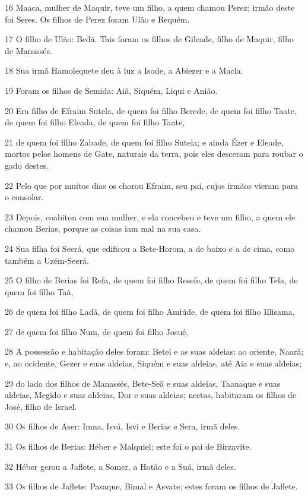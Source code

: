 \par 16 Maaca, mulher de Maquir, teve um filho, a quem chamou Perez; irmão deste foi Seres. Os filhos de Perez foram Ulão e Requém.
\par 17 O filho de Ulão: Bedã. Tais foram os filhos de Gileade, filho de Maquir, filho de Manassés.
\par 18 Sua irmã Hamolequete deu à luz a Isode, a Abiezer e a Macla.
\par 19 Foram os filhos de Semida: Aiã, Siquém, Liqui e Anião.
\par 20 Era filho de Efraim Sutela, de quem foi filho Berede, de quem foi filho Taate, de quem foi filho Eleada, de quem foi filho Taate,
\par 21 de quem foi filho Zabade, de quem foi filho Sutela; e ainda Ézer e Eleade, mortos pelos homens de Gate, naturais da terra, pois eles desceram para roubar o gado destes.
\par 22 Pelo que por muitos dias os chorou Efraim, seu pai, cujos irmãos vieram para o consolar.
\par 23 Depois, coabitou com sua mulher, e ela concebeu e teve um filho, a quem ele chamou Berias, porque as coisas iam mal na sua casa.
\par 24 Sua filha foi Seerá, que edificou a Bete-Horom, a de baixo e a de cima, como também a Uzém-Seerá.
\par 25 O filho de Berias foi Refa, de quem foi filho Resefe, de quem foi filho Tela, de quem foi filho Taã,
\par 26 de quem foi filho Ladã, de quem foi filho Amiúde, de quem foi filho Elisama,
\par 27 de quem foi filho Num, de quem foi filho Josué.
\par 28 A possessão e habitação deles foram: Betel e as suas aldeias; ao oriente, Naarã; e, ao ocidente, Gezer e suas aldeias, Siquém e suas aldeias, até Aia e suas aldeias;
\par 29 do lado dos filhos de Manassés, Bete-Seã e suas aldeias, Taanaque e suas aldeias, Megido e suas aldeias, Dor e suas aldeias; nestas, habitaram os filhos de José, filho de Israel.
\par 30 Os filhos de Aser: Imna, Isvá, Isvi e Berias e Sera, irmã deles.
\par 31 Os filhos de Berias: Héber e Malquiel; este foi o pai de Birzavite.
\par 32 Héber gerou a Jaflete, a Somer, a Hotão e a Suá, irmã deles.
\par 33 Os filhos de Jaflete: Pasaque, Bimal e Asvate; estes foram os filhos de Jaflete.
